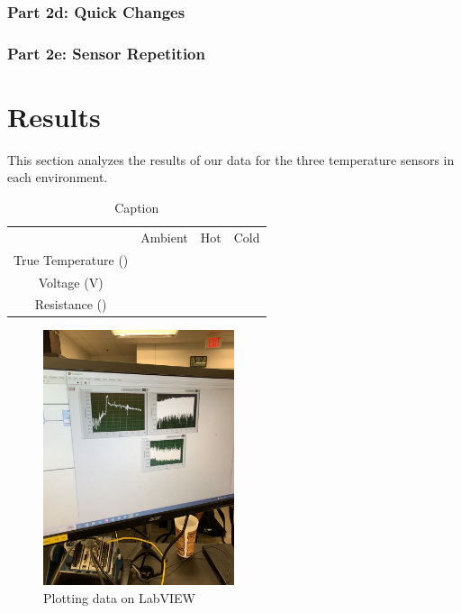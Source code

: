 \documentclass{article}
\begin{document}
\subsubsection{Part 2d: Quick Changes} %


\subsubsection{Part 2e: Sensor Repetition} %



\section{Results}
This section analyzes the results of our data for the three temperature sensors in each environment.

\begin{table}
    \centering
    \begin{tabular}{cccc}
         &  Ambient&  Hot& Cold\\
         True Temperature ()&  &  & \\
         Voltage (V)&  &  & \\
 Resistance ()& & &\\
    \end{tabular}
    \caption{Caption}
    \label{tab:my_label}
\end{table}

\begin{figure}[H]
    \centering
    \includegraphics[width=0.5\textwidth, angle = -90]{lab2images/labview_plots.jpg}
    \caption{Plotting data on LabVIEW}
    \end{figure}
    
\end{document}
